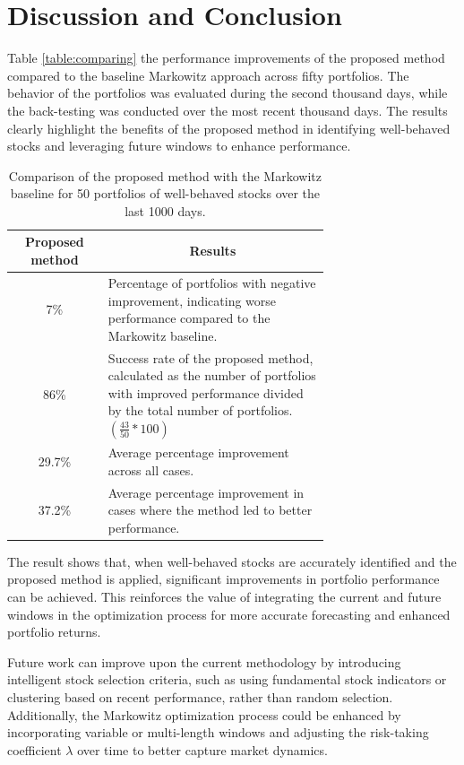 \documentclass[preprint,12pt,authoryear]{elsarticle}
\begin{document}
\section{Discussion and Conclusion}\label{sec:Discussion}
Table \ref{table:comparing}  the performance improvements of the proposed method compared to the baseline Markowitz approach across fifty portfolios. The behavior of the portfolios was evaluated during the second thousand days, while the back-testing was conducted over the most recent thousand days. The results clearly highlight the benefits of the proposed method in identifying well-behaved stocks and leveraging future windows to enhance performance.

\begin{table}
\caption{Comparison of the proposed method with the Markowitz baseline for 50 portfolios of well-behaved stocks over the last 1000 days.}
\label{table:comparing}
\begin{tabular}{c  p{0.7\linewidth}}
  \hline
  \textbf{Proposed method} & \multicolumn{1}{c}{\textbf{Results}} \\ 
  \hline
  7\% & Percentage of portfolios with negative improvement, indicating worse performance compared to the Markowitz baseline.  \\ 
  
  86\% & Success rate of the proposed method, calculated as the number of portfolios with improved performance divided by the total number of portfolios. $(\frac{43}{50}*100)$ \\ 
  
  29.7\% & Average percentage improvement across all cases. \\
  
  37.2\% & Average percentage improvement in cases where the method led to better performance. \\
  \hline
\end{tabular}
\label{tab:compared}
\end{table}

The result shows that, when well-behaved stocks are accurately identified and the proposed method is applied, significant improvements in portfolio performance can be achieved. This reinforces the value of integrating the current and future windows in the optimization process for more accurate forecasting and enhanced portfolio returns.


Future work can improve upon the current methodology by introducing intelligent stock selection criteria, such as using fundamental stock indicators or clustering based on recent performance, rather than random selection. Additionally, the Markowitz optimization process could be enhanced by incorporating variable or multi-length windows and adjusting the risk-taking coefficient \( \lambda \) over time to better capture market dynamics.
\end{document}
